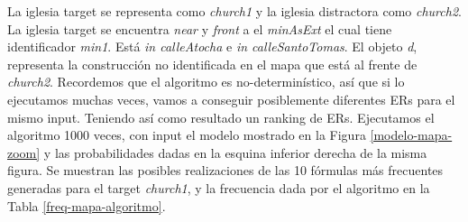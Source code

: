 La iglesia target se representa como {\it church1} y la iglesia distractora como {\it church2}. La iglesia target se encuentra {\it near} y {\it front} a el {\it minAsExt} el cual tiene identificador {\it min1}. Est\'a {\it in calleAtocha} e {\it in calleSantoTomas}. El objeto {\it d}, representa la construcci\'on no identificada en el mapa que est\'a al frente de {\it church2}.
Recordemos que el algoritmo es no-determin\'istico, as\'i que si lo ejecutamos muchas veces, vamos a conseguir posiblemente diferentes ERs para el mismo input. Teniendo as\'i como resultado un ranking de ERs.
Ejecutamos el algoritmo 1000 veces, con input el modelo mostrado en la Figura \ref{modelo-mapa-zoom} y las probabilidades dadas en la esquina inferior derecha de la misma figura. Se muestran las posibles realizaciones de las 10 f\'ormulas m\'as frecuentes generadas para el target {\it church1}, y la frecuencia dada por el algoritmo en la Tabla \ref{freq-mapa-algoritmo}. 

